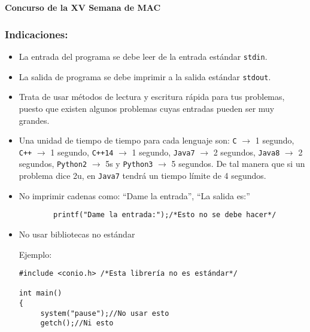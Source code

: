 \chapter*{}
\vspace{-1cm}
\begin{center}
    \Huge \bf Concurso de la XV Semana de MAC
\end{center}

\bigskip

\subsection*{Indicaciones:}

\begin{itemize}

	\item La entrada del programa se debe leer de la entrada estándar \texttt{stdin}.
    
    \item La salida de programa se debe imprimir a la salida estándar \texttt{stdout}.
    
    \item Trata de usar métodos de lectura y escritura rápida para tus problemas, puesto que existen algunos problemas cuyas entradas pueden ser muy grandes.
    
    \item Una unidad de tiempo de tiempo para cada lenguaje son: \texttt{C} $\rightarrow$ 1 segundo, \texttt{C++} $\rightarrow$ 1 segundo, \texttt{C++14} $\rightarrow$ 1 segundo, \texttt{Java7} $\rightarrow$ 2 segundos, \texttt{Java8} $\rightarrow$ 2 segundos, \texttt{Python2} $\rightarrow$ 5s y \texttt{Python3} $\rightarrow$ 5 segundos. De tal manera que si un problema dice 2u, en \texttt{Java7} tendrá un tiempo límite de 4 segundos.
   	
    \item No imprimir cadenas como: ``Dame la entrada'', ``La salida es:''
    \begin{verbatim}
		printf("Dame la entrada:");/*Esto no se debe hacer*/
	\end{verbatim}
    
    \item No usar bibliotecas no estándar
  	
    Ejemplo:
    
    \begin{verbatim}
#include <conio.h> /*Esta librería no es estándar*/

int main()
{
     system("pause");//No usar esto
     getch();//Ni esto
    

\end{verbatim}
\end{itemize}
